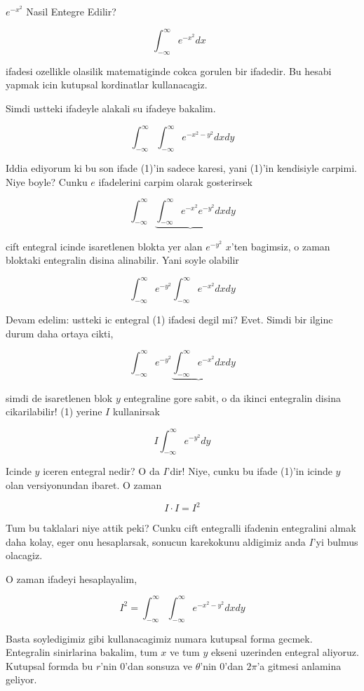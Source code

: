 \documentclass[12pt,fleqn]{article}\usepackage{../common}
\begin{document}
$e^{-x^2}$ Nasil Entegre Edilir? 

\[ \int_{-\infty}^{\infty} e^{-x^2} dx \ \ \ \label{1} \]

ifadesi ozellikle olasilik matematiginde cokca gorulen bir ifadedir. Bu
hesabi yapmak icin kutupsal kordinatlar kullanacagiz. 

Simdi ustteki ifadeyle alakali su ifadeye bakalim. 

\[ \int_{-\infty}^{\infty} \int_{-\infty}^{\infty} e^{-x^2-y^2} dx dy \]

Iddia ediyorum ki bu son ifade (1)'in sadece karesi, yani (1)'in kendisiyle
carpimi. Niye boyle? Cunku $e$ ifadelerini carpim olarak gosterirsek

\[ \int_{-\infty}^{\infty} 
\underbrace{\int_{-\infty}^{\infty} e^{-x^2} e^{-y^2} dx}
dy \]

cift entegral icinde isaretlenen blokta yer alan $e^{-y^2}$ $x$'ten
bagimsiz, o zaman bloktaki entegralin disina alinabilir. Yani soyle olabilir

\[ \int_{-\infty}^{\infty} 
e^{-y^2} \int_{-\infty}^{\infty} e^{-x^2}  dx
dy \]

Devam edelim: ustteki ic entegral (1) ifadesi degil mi? Evet. Simdi bir
ilginc durum daha ortaya cikti, 

\[ \int_{-\infty}^{\infty}  e^{-y^2} 
\underbrace{\int_{-\infty}^{\infty} e^{-x^2}  dx}
dy \]

simdi de isaretlenen blok $y$ entegraline gore sabit, o da ikinci
entegralin disina cikarilabilir! (1) yerine $I$ kullanirsak 

\[ I \int_{-\infty}^{\infty}  e^{-y^2} dy \]

Icinde $y$ iceren entegral nedir? O da $I$'dir! Niye, cunku bu ifade 
(1)'in icinde $y$ olan versiyonundan ibaret. O zaman 

\[ I \cdot I = I^2 \]

Tum bu taklalari niye attik peki? Cunku cift entegralli ifadenin
entegralini almak daha kolay, eger onu hesaplarsak, sonucun karekokunu
aldigimiz anda $I$'yi bulmus olacagiz. 

O zaman ifadeyi hesaplayalim, 

\[ I^2 = \int_{-\infty}^{\infty} \int_{-\infty}^{\infty} e^{-x^2-y^2} dx dy \]

Basta soyledigimiz gibi kullanacagimiz numara kutupsal forma
gecmek. Entegralin sinirlarina bakalim, tum $x$ ve tum $y$ ekseni uzerinden
entegral aliyoruz. Kutupsal formda bu $r$'nin 0'dan sonsuza ve $\theta$'nin
0'dan $2\pi$'a gitmesi anlamina geliyor. 
\end{document}

